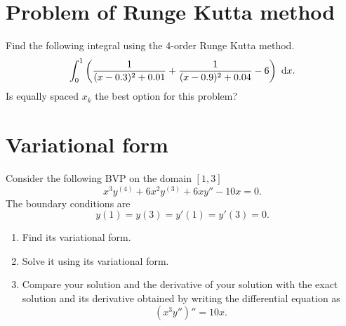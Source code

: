 \section{Problem of Runge Kutta method}
Find the following integral using the 4-order Runge Kutta method.
\[ \int_{0}^{1}\left(\frac{1}{(x-0.3)^2+0.01}+\frac{1}{(x-0.9)^2+0.04}-6\right)~\mathrm{d} x. \]
Is equally spaced \(x_k\) the best option for this problem?


\section{Variational form}
Consider the following BVP on the domain \([1,3]\)
\[ x^3y^{(4)}+6x^2y^{(3)}+6xy''-10x=0. \]
The boundary conditions are
\[ y(1)=y(3)=y'(1)=y'(3)=0. \]
\begin{enumerate}
	\item Find its variational form.
	\item Solve it using its variational form.
	\item Compare your solution and the derivative of your solution with the exact solution and its derivative obtained by writing the differential equation as
	\[ \left(x^3 y''\right)''=10x. \]
\end{enumerate}